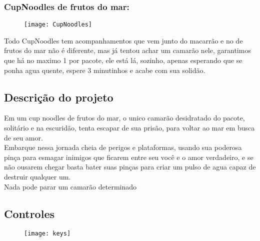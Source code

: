         \subsubsection{CupNoodles de frutos do mar:}
            \begin{figure}[H]
                \texttt{[image: CupNoodles]}
            \centering
            \end{figure}
            
            Todo CupNoodles tem acompanhamentos que vem junto do macarrão e no de frutos do mar não é diferente, mas já tentou achar um camarão nele, garantimos que há no maximo 1 por pacote, ele está lá, sozinho, apenas esperando que se ponha agua quente, espere 3 minutinhos e acabe com sua solidão.

    \subsection{Descrição do projeto}%
Em um cup noodles de frutos do mar, o unico camarão desidratado do pacote, solitário e na escuridão, tenta escapar de sua prisão, para voltar ao mar em busca de seu amor.\\
Embarque nessa jornada cheia de perigos e plataformas, usando sua poderosa pinça para esmagar inimigos que ficarem entre seu você e o amor verdadeiro, e se não ousarem chegar basta bater suas pinças para criar um pulso de agua capaz de destruir qualquer um.\\
Nada pode parar um camarão determinado\\

    \subsection{Controles}%
    \begin{figure}[H]
        \texttt{[image: keys]}
    \centering
    \end{figure}

